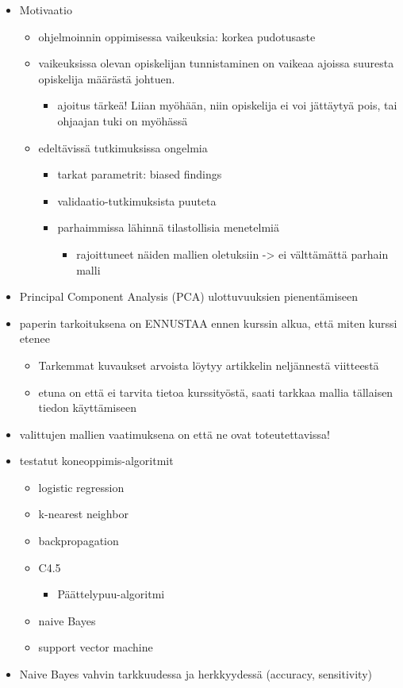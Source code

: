 \begin{itemize}
    \item Motivaatio
    \begin{itemize}
        \item ohjelmoinnin oppimisessa vaikeuksia: korkea pudotusaste
        \item vaikeuksissa olevan opiskelijan tunnistaminen on vaikeaa ajoissa suuresta opiskelija määrästä johtuen.
        \begin{itemize}
            \item ajoitus tärkeä! Liian myöhään, niin opiskelija ei voi jättäytyä pois, tai ohjaajan tuki on myöhässä
        \end{itemize}
        \item edeltävissä tutkimuksissa ongelmia
        \begin{itemize}
            \item tarkat parametrit: biased findings
            \item validaatio-tutkimuksista puuteta
            \item parhaimmissa lähinnä tilastollisia menetelmiä
            \begin{itemize}
                \item rajoittuneet näiden mallien oletuksiin -> ei välttämättä parhain malli
            \end{itemize}
        \end{itemize}
    \end{itemize}
    \item Principal Component Analysis (PCA) ulottuvuuksien pienentämiseen
    \item paperin tarkoituksena on ENNUSTAA ennen kurssin alkua, että miten kurssi etenee
    \begin{itemize}
        \item Tarkemmat kuvaukset arvoista löytyy artikkelin neljännestä viitteestä
        \item etuna on että ei tarvita tietoa kurssityöstä, saati tarkkaa mallia tällaisen tiedon käyttämiseen
    \end{itemize}
    \item valittujen mallien vaatimuksena on että ne ovat toteutettavissa!
    \item testatut koneoppimis-algoritmit
    \begin{itemize}
        \item logistic regression
        \item k-nearest neighbor
        \item backpropagation
        \item C4.5
        \begin{itemize}
            \item Päättelypuu-algoritmi
        \end{itemize}
        \item naive Bayes
        \item support vector machine
    \end{itemize}
    \item Naive Bayes vahvin tarkkuudessa ja herkkyydessä (accuracy, sensitivity)
\end{itemize}


